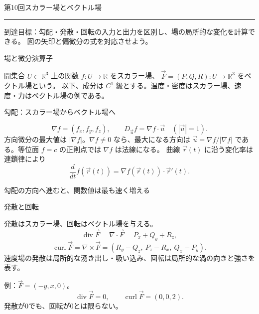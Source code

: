 \documentclass[a4paper,10pt,pdflatex,ja=standard,jafont=ipaex-type1,
  magstyle=real,scale=1]{bxjsarticle}
\newcommand{\handoutnumber}{10}
\newcommand{\handouttitle}[1]{%
  \begin{center}
    {\Large\color{ink}#1}\par\vspace{3mm}
    {\color{accent}\rule{0.88\linewidth}{0.7pt}}
  \end{center}\vspace{-2mm}}
\newcommand{\handout}[2]{%
  \renewcommand{\handoutnumber}{#1}%
  \handouttitle{第#1回\quad #2}}
\newcommand{\topic}[1]{\par\vspace{5pt}%
  {\large\sffamily\mdseries\color{accent}#1}\par\vspace{2pt}}
\newcommand{\keybox}[1]{\par\vspace{3pt}\begingroup
  \setlength{\fboxsep}{4pt}%
  \colorbox{soft}{\parbox{\dimexpr\linewidth-2\fboxsep\relax}{\small #1}}%
  \endgroup\par\vspace{2pt}}
\newcommand{\examplelabel}[1]{{\sffamily\mdseries\color{ink}#1}}
\begin{document}
\fontsize{10pt}{13.5pt}\selectfont
\setlength{\abovedisplayskip}{4pt}
\setlength{\belowdisplayskip}{4pt}
\handout{10}{スカラー場とベクトル場}
\keybox{到達目標：勾配・発散・回転の入力と出力を区別し、場の局所的な変化を計算できる。
図の矢印と偏微分の式を対応させよう。}

\topic{場と微分演算子}
開集合 $U\subset\mathbb R^3$ 上の関数 $f:U\to\mathbb R$ をスカラー場、
$\vec F=(P,Q,R):U\to\mathbb R^3$ をベクトル場という。
以下、成分は $C^1$ 級とする。温度・密度はスカラー場、速度・力はベクトル場の例である。


\topic{勾配：スカラー場からベクトル場へ}
$$
 \nabla f=(f_x,f_y,f_z),\qquad
 D_{\vec u}f=\nabla f\cdot\vec u\quad(|\vec u|=1).
$$
方向微分の最大値は $|\nabla f|$。$\nabla f\ne0$ なら、最大になる方向は
$\vec u=\nabla f/|\nabla f|$ である。等位面 $f=c$ の正則点では $\nabla f$ は法線になる。
曲線 $\vec r(t)$ に沿う変化率は連鎖律により
$$
 \frac d{dt}f(\vec r(t))=\nabla f(\vec r(t))\cdot\vec r'(t).
$$


\par\vspace{2pt}\noindent
\begin{minipage}[b]{0.98\linewidth}\centering
{}\par
{\small\color{muted}勾配の方向へ進むと、関数値は最も速く増える}\par
\end{minipage}
\par\vspace{2pt}

\topic{発散と回転}
発散はスカラー場、回転はベクトル場を与える。
$$
 \operatorname{div}\vec F=\nabla\cdot\vec F=P_x+Q_y+R_z,
$$
$$
 \operatorname{curl}\vec F=\nabla\times\vec F
 =(R_y-Q_z,\ P_z-R_x,\ Q_x-P_y).
$$
速度場の発散は局所的な湧き出し・吸い込み、回転は局所的な渦の向きと強さを表す。
\par\examplelabel{例：$\vec F=(-y,x,0)$。}
$$
 \operatorname{div}\vec F=0,\qquad
 \operatorname{curl}\vec F=(0,0,2).
$$
発散が0でも、回転が0とは限らない。
\end{document}
